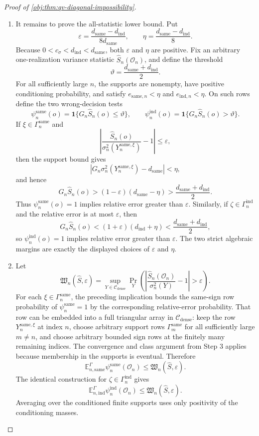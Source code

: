 \documentclass[11pt]{article}
\begin{document}
\begin{proof}[Proof of \cref{obj:thm:qv-diagonal-impossibility}]
\begin{enumerate}
\item It remains to prove the all-statistic lower bound. Put
\[
\varepsilon=\frac{d_{\mathrm{same}}-d_{\mathrm{ind}}}{8d_{\mathrm{same}}},
\qquad
\eta=\frac{d_{\mathrm{same}}-d_{\mathrm{ind}}}{8}.
\]
Because \(0<c_\sigma<d_{\mathrm{ind}}<d_{\mathrm{same}}\), both \(\varepsilon\) and \(\eta\) are positive. Fix an arbitrary one-realization variance statistic \(\widehat S_n(\mathcal O_n)\), and define the threshold
\[
\vartheta=\frac{d_{\mathrm{same}}+d_{\mathrm{ind}}}{2}.
\]
For all sufficiently large \(n\), the supports are nonempty, have positive conditioning probability, and satisfy \(e_{\mathrm{same},n}<\eta\) and \(e_{\mathrm{ind},n}<\eta\). On such rows define the two wrong-decision tests
\[
\psi_n^{\mathrm{same}}(o)=\mathbf 1\{G_n\widehat S_n(o)\le\vartheta\},
\qquad
\psi_n^{\mathrm{ind}}(o)=\mathbf 1\{G_n\widehat S_n(o)>\vartheta\}.
\]
If \(\xi\in\Gamma_n^{\mathrm{same}}\) and
\[
\left|
\frac{\widehat S_n(o)}{\sigma_n^2(Y_n^{\mathrm{same},\xi})}-1
\right|\le\varepsilon,
\]
then the support bound gives
\[
|G_n\sigma_n^2(Y_n^{\mathrm{same},\xi})-d_{\mathrm{same}}|<\eta,
\]
and hence
\[
G_n\widehat S_n(o)
>
(1-\varepsilon)(d_{\mathrm{same}}-\eta)
>
\frac{d_{\mathrm{same}}+d_{\mathrm{ind}}}{2}.
\]
Thus \(\psi_n^{\mathrm{same}}(o)=1\) implies relative error greater than \(\varepsilon\). Similarly, if \(\zeta\in\Gamma_n^{\mathrm{ind}}\) and the relative error is at most \(\varepsilon\), then
\[
G_n\widehat S_n(o)
<
(1+\varepsilon)(d_{\mathrm{ind}}+\eta)
<
\frac{d_{\mathrm{same}}+d_{\mathrm{ind}}}{2},
\]
so \(\psi_n^{\mathrm{ind}}(o)=1\) implies relative error greater than \(\varepsilon\). The two strict algebraic margins are exactly the displayed choices of \(\varepsilon\) and \(\eta\). %

\item Let
\[
\mathfrak W_n(\widehat S,\varepsilon)
=
\sup_{Y\in\mathcal C_{\mathrm{dense}}}
\Pr_Y\!\left(
\left|
\frac{\widehat S_n(\mathcal O_n)}{\sigma_n^2(Y)}-1
\right|>\varepsilon
\right).
\]
For each \(\xi\in\Gamma_n^{\mathrm{same}}\), the preceding implication bounds the same-sign row probability of \(\psi_n^{\mathrm{same}}=1\) by the corresponding relative-error probability. That row can be embedded into a full triangular array in \(\mathcal C_{\mathrm{dense}}\): keep the row \(Y_n^{\mathrm{same},\xi}\) at index \(n\), choose arbitrary support rows \(\Gamma_m^{\mathrm{same}}\) for all sufficiently large \(m\ne n\), and choose arbitrary bounded sign rows at the finitely many remaining indices. The convergence and class argument from Step 3 applies because membership in the supports is eventual. Therefore
\[
\mathbb E_{n,\mathrm{same}}^{\Gamma}\psi_n^{\mathrm{same}}(\mathcal O_n)
\le
\mathfrak W_n(\widehat S,\varepsilon).
\]
The identical construction for \(\zeta\in\Gamma_n^{\mathrm{ind}}\) gives
\[
\mathbb E_{n,\mathrm{ind}}^{\Gamma}\psi_n^{\mathrm{ind}}(\mathcal O_n)
\le
\mathfrak W_n(\widehat S,\varepsilon).
\]
Averaging over the conditioned finite supports uses only positivity of the conditioning masses. %


\end{enumerate}
\end{proof}
\end{document}
